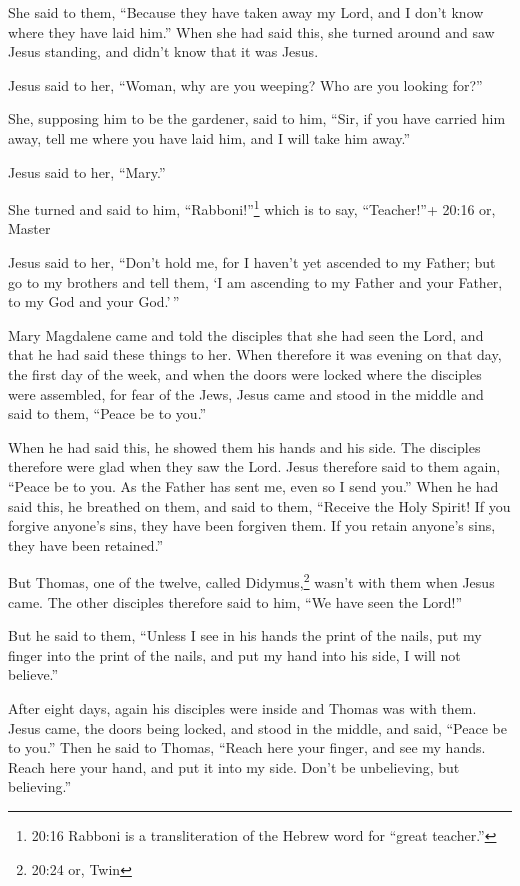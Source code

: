 She said to them, ``Because they have taken away my Lord, and I don't
know where they have laid him.''  When she had said this,
she turned around and saw Jesus standing, and didn't know that it was
Jesus.

 Jesus said to her, ``Woman, why are you weeping? Who are
you looking for?''

She, supposing him to be the gardener, said to him, ``Sir, if you have
carried him away, tell me where you have laid him, and I will take him
away.''

 Jesus said to her, ``Mary.''

She turned and said to him, ``Rabboni!''\footnote{20:16 Rabboni is a
  transliteration of the Hebrew word for ``great teacher.''} which is to
say, ``Teacher!''+ 20:16 or, Master

 Jesus said to her, ``Don't hold me, for I haven't yet
ascended to my Father; but go to my brothers and tell them, `I am
ascending to my Father and your Father, to my God and your God.'\,''

 Mary Magdalene came and told the disciples that she had
seen the Lord, and that he had said these things to her. 
When therefore it was evening on that day, the first day of the week,
and when the doors were locked where the disciples were assembled, for
fear of the Jews, Jesus came and stood in the middle and said to them,
``Peace be to you.''

 When he had said this, he showed them his hands and his
side. The disciples therefore were glad when they saw the Lord.
 Jesus therefore said to them again, ``Peace be to you. As
the Father has sent me, even so I send you.''  When he had
said this, he breathed on them, and said to them, ``Receive the Holy
Spirit!  If you forgive anyone's sins, they have been
forgiven them. If you retain anyone's sins, they have been retained.''

 But Thomas, one of the twelve, called Didymus,\footnote{20:24
  or, Twin} wasn't with them when Jesus came.  The other
disciples therefore said to him, ``We have seen the Lord!''

But he said to them, ``Unless I see in his hands the print of the nails,
put my finger into the print of the nails, and put my hand into his
side, I will not believe.''

 After eight days, again his disciples were inside and
Thomas was with them. Jesus came, the doors being locked, and stood in
the middle, and said, ``Peace be to you.''  Then he said to
Thomas, ``Reach here your finger, and see my hands. Reach here your
hand, and put it into my side. Don't be unbelieving, but believing.''

